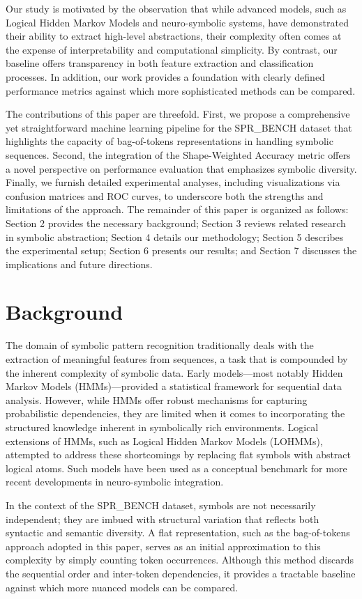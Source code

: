 \documentclass{article}
\begin{document}
Our study is motivated by the observation that while advanced models, such as Logical Hidden Markov Models and neuro-symbolic systems, have demonstrated their ability to extract high-level abstractions, their complexity often comes at the expense of interpretability and computational simplicity. By contrast, our baseline offers transparency in both feature extraction and classification processes. In addition, our work provides a foundation with clearly defined performance metrics against which more sophisticated methods can be compared.

The contributions of this paper are threefold. First, we propose a comprehensive yet straightforward machine learning pipeline for the SPR\_BENCH dataset that highlights the capacity of bag-of-tokens representations in handling symbolic sequences. Second, the integration of the Shape-Weighted Accuracy metric offers a novel perspective on performance evaluation that emphasizes symbolic diversity. Finally, we furnish detailed experimental analyses, including visualizations via confusion matrices and ROC curves, to underscore both the strengths and limitations of the approach. The remainder of this paper is organized as follows: Section 2 provides the necessary background; Section 3 reviews related research in symbolic abstraction; Section 4 details our methodology; Section 5 describes the experimental setup; Section 6 presents our results; and Section 7 discusses the implications and future directions.

\section{Background}
The domain of symbolic pattern recognition traditionally deals with the extraction of meaningful features from sequences, a task that is compounded by the inherent complexity of symbolic data. Early models—most notably Hidden Markov Models (HMMs)—provided a statistical framework for sequential data analysis. However, while HMMs offer robust mechanisms for capturing probabilistic dependencies, they are limited when it comes to incorporating the structured knowledge inherent in symbolically rich environments. Logical extensions of HMMs, such as Logical Hidden Markov Models (LOHMMs), attempted to address these shortcomings by replacing flat symbols with abstract logical atoms. Such models have been used as a conceptual benchmark for more recent developments in neuro-symbolic integration.

In the context of the SPR\_BENCH dataset, symbols are not necessarily independent; they are imbued with structural variation that reflects both syntactic and semantic diversity. A flat representation, such as the bag-of-tokens approach adopted in this paper, serves as an initial approximation to this complexity by simply counting token occurrences. Although this method discards the sequential order and inter-token dependencies, it provides a tractable baseline against which more nuanced models can be compared. 
\end{document}
